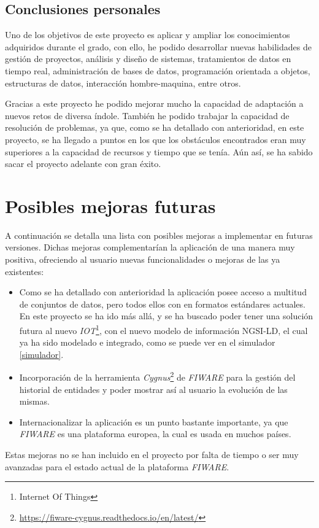 \subsection{Conclusiones personales}
Uno de los objetivos de este proyecto es aplicar y ampliar los conocimientos adquiridos durante el grado, con ello, he podido desarrollar nuevas habilidades de gestión de proyectos, análisis y diseño de sistemas, tratamientos de datos en tiempo real, administración de bases de datos, programación orientada a objetos, estructuras de datos, interacción hombre-maquina, entre otros.

Gracias a este proyecto he podido mejorar mucho la capacidad de adaptación a nuevos retos de diversa índole. También he podido trabajar la capacidad de resolución de problemas, ya que, como se ha detallado con anterioridad, en este proyecto, se ha llegado a puntos en los que los obstáculos encontrados eran muy superiores a la capacidad de recursos y tiempo que se tenía. Aún así, se ha sabido sacar el proyecto adelante con gran éxito.


\section{Posibles mejoras futuras}

A continuación se detalla una lista con posibles mejoras a implementar en futuras versiones. Dichas mejoras complementarían la aplicación de una manera muy positiva, ofreciendo al usuario nuevas funcionalidades o mejoras de las ya existentes:
\begin{itemize}

    \item Como se ha detallado con anterioridad la aplicación posee acceso a multitud de conjuntos de datos, pero todos ellos con en formatos estándares actuales. En este proyecto se ha ido más allá, y se ha buscado poder tener una solución futura al nuevo \textit{IOT}\footnote{Internet Of Things}, con el nuevo modelo de información NGSI-LD, el cual ya ha sido modelado e integrado, como se puede ver en el simulador \ref{simulador}.

    \item Incorporación de la herramienta \textit{Cygnus}\footnote{\url{https://fiware-cygnus.readthedocs.io/en/latest/}} de \textit{FIWARE} para la gestión del historial de entidades y poder mostrar así al usuario la evolución de las mismas.

    \item Internacionalizar la aplicación es un punto bastante importante, ya que \textit{FIWARE} es una plataforma europea, la cual es usada en muchos países.
    
\end{itemize}

Estas mejoras no se han incluido en el proyecto por falta de tiempo o ser muy avanzadas para el estado actual de la plataforma \textit{FIWARE}.